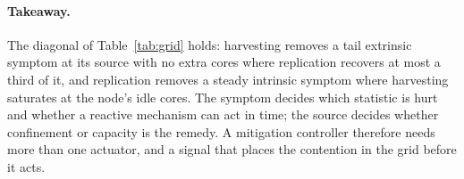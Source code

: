 \paragraph{Takeaway.}
The diagonal of Table~\ref{tab:grid} holds: harvesting removes a tail
extrinsic symptom at its source with no extra cores where replication
recovers at most a third of it, and replication removes a steady intrinsic
symptom where harvesting saturates at the node's idle cores. The symptom
decides which statistic is hurt and whether a reactive mechanism can act
in time; the source decides whether confinement or capacity is the remedy.
A mitigation controller therefore needs more than one actuator, and a
signal that places the contention in the grid before it acts.
